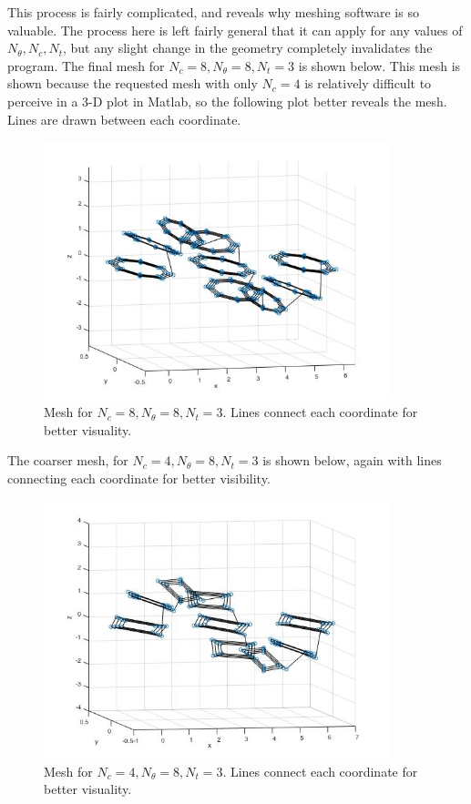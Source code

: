 \documentclass[10pt]{article}
\begin{document}
This process is fairly complicated, and reveals why meshing software is so valuable. The process here is left fairly general that it can apply for any values of \(N_\theta, N_c, N_t\), but any slight change in the geometry completely invalidates the program. The final mesh for \(N_c=8, N_\theta=8, N_t=3\) is shown below. This mesh is shown because the requested mesh with only \(N_c=4\) is relatively difficult to perceive in a 3-D plot in Matlab, so the following plot better reveals the mesh. Lines are drawn between each coordinate.

\begin{figure}[H]
  \centering
  \includegraphics[width=10cm]{RefinedMesh.jpg}
  \caption{Mesh for \(N_c=8, N_\theta=8, N_t=3\). Lines connect each coordinate for better visuality.}
\end{figure}

The coarser mesh, for \(N_c=4, N_\theta=8, N_t=3\) is shown below, again with lines connecting each coordinate for better visibility.

\begin{figure}[H]
  \centering
  \includegraphics[width=10cm]{CoarseMesh.jpg}
  \caption{Mesh for \(N_c=4, N_\theta=8, N_t=3\). Lines connect each coordinate for better visuality.}
\label{fig:CoarseMesh}
\end{figure}
\end{document}
